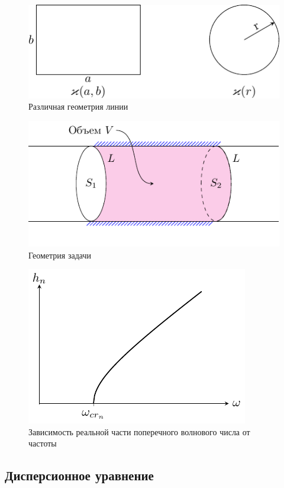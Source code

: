 \begin{figure}[h!]
	\centering
	\includegraphics[scale=1.5]{img/lect2_ris4}
	\caption{Различная геометрия линии}
	\label{fig:wavegain:4}
\end{figure}

\begin{figure}[h!]
	\centering
	\includegraphics[scale=1.5]{img/lect2_ris5}
	\caption{Геометрия задачи}
	\label{fig:wavegain:5}
\end{figure}

\begin{figure}[h!]
	\centering
	\includegraphics[scale=1.6]{img/lect2_ris6}
	\caption{Зависимость реальной части поперечного волнового числа от частоты}
	\label{fig:wavegain:5}
\end{figure}

\subsection{Дисперсионное уравнение}